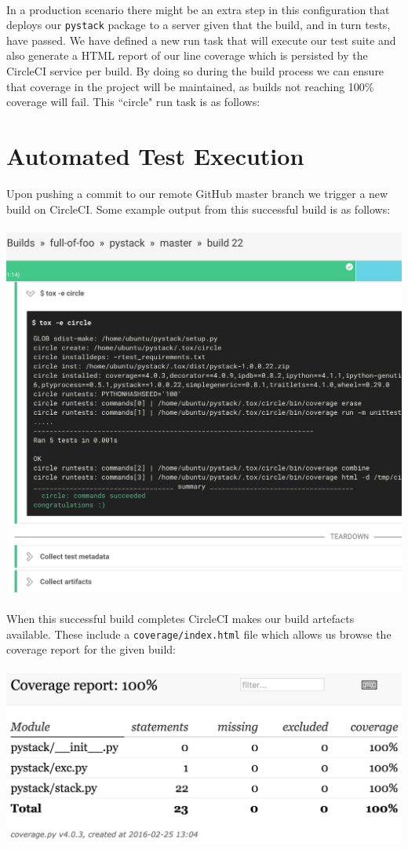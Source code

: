 \documentclass[a4paper, 11pt]{article}
\begin{document}
\\
In a production scenario there might be an extra step in this configuration that deploys our \lstinline$pystack$ package to a server given that the build, and in turn tests, have passed. We have defined
a new run task that will execute our test suite and also generate a HTML report of our line coverage which is persisted by the CircleCI service per build. 
By doing so during the build process we can ensure that coverage in the project will be maintained, as builds not reaching 100\% coverage will fail. This ``circle" run task is as follows:
\\


\newpage
\section*{Automated Test Execution}
Upon pushing a commit to our remote GitHub master branch we  trigger a new build on CircleCI. Some example output from this successful build is as follows:
\\
\\
\includegraphics[scale=0.58]{circle}
\\
\\
When this successful build completes CircleCI makes our build artefacts available. These include a  \lstinline$coverage/index.html$ file which allows us browse the coverage report for 
the given build:
\\
\\
\includegraphics[scale=0.6]{cov}
 
\end{document}
